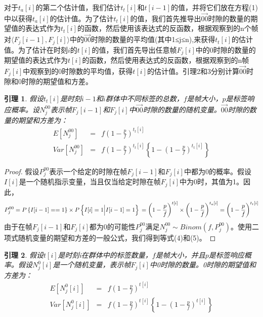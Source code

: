 \documentclass[UTF8]{ctexart}
\newtheorem{lemma}{引理}
\newtheorem*{proof}{证明}
\begin{document}
	对于$t_a[i]$的第二个估计值，我们估计$t_t[i]$和$t[i-1]$的值，并将它们放在方程(1)中以获得$t_a[i]$的估计值。为了估计$t_t[i]$的值，我们首先推导出$\overrightarrow{00}$时隙的数量的期望值的表达式作为$t_t[i]$的函数，然后使用该表达式的反函数，根据观察到的n个帧对$\langle F_j[i-1],F_j[i]\rangle$中的$\overrightarrow{00}$时隙的数量的平均值(其中1≤j≤n),来获得$t_t[i]$的估计值。为了估计在时刻$i$的$t[i]$的值，我们首先导出任意帧$F_j[i]$中的0时隙的数量的期望值的表达式作为$t[i]$的函数，然后使用表达式的反函数，根据观察到的n帧$F_j[i]$中观察到的0时隙数的平均值，获得$t[i]$的估计值。引理2和3分别计算$\overrightarrow{00}$时隙和0时隙的期望值和方差。
	
	\begin{lemma}
		假设$t_t[i]$是时刻$i-1$和$i$群体中不同标签的总数，$f$是帧大小，$p$是标签响应概率。设$N^{00}_j$表示帧$F_j[i-1]$和$F_j[i]$中$\overrightarrow{00}$时隙的数量的随机变量。$\overrightarrow{00}$时隙的数量的期望和方差为：
		\begin{eqnarray}
		E[N^{00}_j]&=&f\left(1-\frac{p}{f}\right)^{t_t[i]}\\
		Var[N^{00}_j]&=& f\left(1-\frac{p}{f}\right)^{t_t[i]}\left\{1-\left(1-\frac{p}{f}\right)^{t_t[i]}\right\}
		\end{eqnarray}
	\end{lemma}
	
	\begin{proof}
		假设$P^{00}_j$表示一个给定的时隙在帧$F_j[i-1]$和$F_j[i]$中都为0的概率。假设$I[i]$是一个随机指示变量，当且仅当给定时隙在帧$F_j[i]$中为0时，其值为1。因此，
		\begin{equation}
		P^{00}_j=P\left\{I[i-1]==1\right\}\times P\left\{I[i]=1\Big|I[i-1]=1\right\}\\
		=\left(1-\frac{p}{f}\right)^{t[i]}\times\left(1-\frac{p}{f}\right)^{t_a[i]}=\left(1-\frac{p}{f}\right)^{t_t[i]}
		\end{equation}
		由于在帧$F_j[i-1]$和$F_j[i]$都为0的可能性$P^{00}_j$满足$N^{00}_j\sim Binom(f,P^{00}_j)$。使用二项式随机变量的期望和方差的一般公式，我们得到等式(4)和(5)。	
	\end{proof}
	
	\begin{lemma}
		假设$t[i]$是时刻i在群体中的标签数量，$f$是帧大小，并且$p$是标签响应概率。假设$N^0_j[i]$是一个随机变量，表示帧$F_j [i]$中0时隙的数量。0时隙的期望值和方差为：
		\begin{eqnarray}
		E[N^0_j[i]]&=&f\left(1-\frac{p}{f}\right)^{t[i]}\\
		Var[N^0_j[i]]&=&f\left(1-\frac{p}{f}\right)^{t[i]}\left\{1-\left(1-\frac{p}{f}\right)^{t[i]}\right\}
		\end{eqnarray}
	\end{lemma}
	
\end{document}
